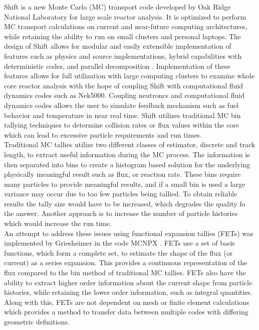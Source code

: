 \documentclass[10tma4paper]{article}
\begin{document}
 Shift is a new Monte Carlo (MC) transport code developed by Oak Ridge National Laboratory for large scale reactor analysis. It is optimized to perform MC transport calculations on current and near-future computing architectures, while retaining the ability to run on small clusters and personal laptops. The design of Shift allows for modular and easily extensible implementation of features such as physics and source implementations, hybrid capabilities with deterministic codes, and parallel decomposition \cite{SHIFT}. Implementation of these features allows for full utilization with large computing clusters to examine whole core reactor analysis with the hope of coupling Shift with computational fluid dynamics codes such as Nek5000. Coupling neutroncs and computational fluid dynamics codes allows the user to simulate feedback mechanism such as fuel behavior and temperature in near real time. Shift utilizes traditional MC bin tallying techniques to determine collision rates or flux values within the core which can lead to excessive particle requirements and run times.
\\
Traditional MC tallies utilize two different classes of estimator, discrete and track length, to extract useful information during the MC process. The information is then separated into bins to create a histogram based solution for the underlying physically meaningful result such as flux, or reaction rate. These bins require many particles to provide meaningful results, and if a small bin is used a large variance may occur due to too few particles being tallied. To obtain reliable results the tally size would have to be increased, which degrades the quality fo the answer. Another approach is to increase the number of particle histories which would increase the run time.
\\
An attempt to address these issues using functional expansion tallies (FETs) was implemented by Griesheimer in the code MCNPX \cite{FETThesis}\cite{ScalarFET}. FETs use a set of basis functions, which form a complete set, to estimate the shape of the flux (or current) as a series expansion. This provides a continuous representation of the flux compared to the bin method of traditional MC tallies. FETs also have the ability to extract higher order information about the current shape from particle histories, while retaining the lower order information, such as integral quantities. Along with this, FETs are not dependent on mesh or finite element calculations which provides a method to transfer data between multiple codes with differing geometric definitions.  
\\
\end{document}
